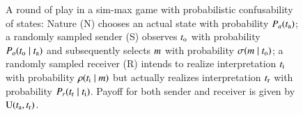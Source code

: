 \documentclass[fleqn,reqno,10pt]{article}
\newcommand{\similarity}{\ensuremath{\mathrm{Sim}}} %
\begin{document}
\begin{figure}
  \centering


  \caption{A round of play in a sim-max game with probabilistic confusability of states: Nature
    (N) chooses an actual state with probability $P_a(t_{\mathrm{a}})$; a randomly sampled sender
    (S) observes $t_{\mathrm{o}}$ with probability $P_o(t_{\mathrm{o}} \mid t_{\mathrm{a}})$ and
    subsequently selects $m$ with probability $\sigma(m \mid t_{\mathrm{o}})$; a
    randomly sampled receiver (R) intends to realize interpretation $t_{\mathrm{i}}$ with
    probability $\rho(t_{\mathrm{i}} \mid m)$ but actually realizes interpretation
    $t_{\mathrm{r}}$ with probability $P_r(t_{\mathrm{r}} \mid t_{\mathrm{i}})$. Payoff for both
    sender and receiver is given by $\mathrm{U}(t_{\mathrm{a}}, t_{\mathrm{r}})$.}
  \label{fig:imprecise-sim-max-illustration}
\end{figure}
\end{document}
